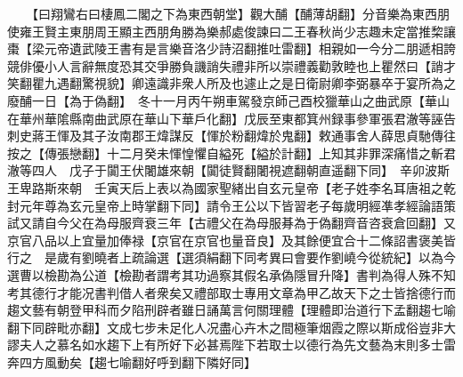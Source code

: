 　　【曰翔鸞右曰棲鳳二閣之下為東西朝堂】觀大酺【酺薄胡翻】分音樂為東西朋使雍王賢主東朋周王顯主西朋角勝為樂郝處俊諫曰二王春秋尚少志趣未定當推棃讓棗【梁元帝遺武陵王書有是言樂音洛少詩沼翻推吐雷翻】相親如一今分二朋遞相誇競俳優小人言辭無度恐其交爭勝負譏誚失禮非所以崇禮義勸敦睦也上瞿然曰【誚才笑翻瞿九遇翻驚視貌】卿遠識非衆人所及也遽止之是日衛尉卿李弼暴卒于宴所為之廢酺一日【為于偽翻】　冬十一月丙午朔車駕發京師己酉校獵華山之曲武原【華山在華州華隂縣南曲武原在華山下華戶化翻】戊辰至東都箕州録事參軍張君澈等誣告刺史蔣王惲及其子汝南郡王煒謀反【惲於粉翻煒於鬼翻】敕通事舍人薛思貞馳傳往按之【傳張戀翻】十二月癸未惲惶懼自縊死【縊於計翻】上知其非罪深痛惜之斬君澈等四人　戊子于闐王伏闍雄來朝【闐徒賢翻闍視遮翻朝直遥翻下同】　辛卯波斯王卑路斯來朝　壬寅天后上表以為國家聖緒出自玄元皇帝【老子姓李名耳唐祖之乾封元年尊為玄元皇帝上時掌翻下同】請令王公以下皆習老子每歲明經凖孝經論語策試又請自今父在為母服齊衰三年【古禮父在為母服朞為于偽翻齊音咨衰倉回翻】又京官八品以上宜量加俸禄【京官在京官也量音良】及其餘便宜合十二條詔書褒美皆行之　是歲有劉曉者上疏論選【選須絹翻下同考異曰會要作劉嶢今從統紀】以為今選曹以檢勘為公道【檢勘者謂考其功過察其假名承偽隱冒升降】書判為得人殊不知考其德行才能况書判借人者衆矣又禮部取士專用文章為甲乙故天下之士皆捨德行而趨文藝有朝登甲科而夕陷刑辟者雖日誦萬言何關理體【理體即治道行下孟翻趨七喻翻下同辟毗亦翻】文成七步未足化人况盡心卉木之間極筆烟霞之際以斯成俗豈非大謬夫人之慕名如水趨下上有所好下必甚焉陛下若取士以德行為先文藝為末則多士雷奔四方風動矣【趨七喻翻好呼到翻下隣好同】


